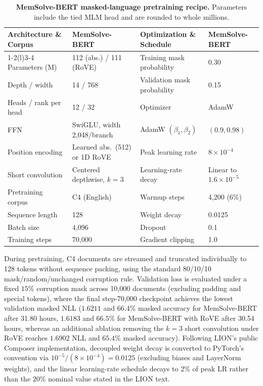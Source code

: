\documentclass[10pt,twocolumn]{article}
\let\draftsmall\small
\renewcommand{\small}{\draftsmall\fontsize{9}{10}\selectfont}
\begin{document}
\begin{table}[!ht]
\centering
\small
\captionsetup{width=.96\linewidth}
\setlength{\tabcolsep}{6pt}
\renewcommand{\arraystretch}{1.04}
\begin{tabular}{ll@{\hspace{22pt}}ll}
\toprule
Architecture \& Corpus & MemSolve-BERT & Optimization \& Schedule & MemSolve-BERT\\
\cmidrule(r){1-2}\cmidrule(l){3-4}
Parameters (M) & 112 (abs.) / 111 (RoVE) & Training mask probability & 0.30\\
Depth / width & 14 / 768 & Validation mask probability & 0.15\\
Heads / rank per head & 12 / 32 & Optimizer & AdamW\\
FFN & SwiGLU, width 2,048/branch & AdamW $(\beta_1,\beta_2)$ & $(0.9,0.98)$\\
Position encoding & Learned abs.\ (512) or 1D RoVE & Peak learning rate & $8\times10^{-4}$\\
Short convolution & Centered depthwise, $k=3$ & Learning-rate decay & Linear to $1.6\times10^{-5}$\\
Pretraining corpus & C4 (English) & Warmup steps & 4,200 (6\%)\\
Sequence length & 128 & Weight decay & 0.0125\\
Batch size & 4,096 & Dropout & 0.1\\
Training steps & 70,000 & Gradient clipping & 1.0\\
\bottomrule
\end{tabular}
\caption{\textbf{MemSolve-BERT masked-language pretraining recipe.}
Parameters include the tied MLM head and are rounded to whole millions.}
\label{tab:mlm-recipe}
\end{table}

During pretraining, C4 documents are streamed and truncated individually to
128 tokens without sequence packing, using the standard 80/10/10
mask/random/unchanged corruption rule.
Validation loss is evaluated under a fixed $15\%$ corruption mask across
10,000 documents (excluding padding and special tokens), where the final
step-70,000 checkpoint achieves the lowest validation masked NLL
($1.6211$ and $66.4\%$ masked accuracy for MemSolve-BERT after 31.80 hours,
$1.6183$ and $66.5\%$ for MemSolve-BERT with RoVE after 30.54 hours, whereas an
additional
ablation removing the $k=3$ short convolution under RoVE reaches $1.6902$ NLL
and $65.4\%$ masked accuracy).
Following LION's public Composer implementation, decoupled weight decay is
converted to PyTorch's convention via $10^{-5}/(8\times10^{-4})=0.0125$
(excluding biases and LayerNorm weights), and the linear learning-rate
schedule decays to $2\%$ of peak LR rather than the $20\%$ nominal value
stated in the LION text.
\end{document}
